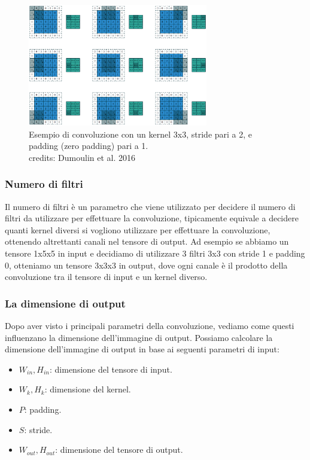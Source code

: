     \begin{figure}[H]
        \centering
        \includegraphics[width=0.7\textwidth]{imgs/kernel_convolution_padding_stride.png}
        \caption{Esempio di convoluzione con un kernel 3x3, stride pari a 2, e padding (zero padding) pari a 1.\\
        credits: Dumoulin et al. 2016 \cite{dumoulin2016guide}}
        \label{fig:kernel_convolution_padding_stride}
    \end{figure}

\subsubsection{Numero di filtri}
Il numero di filtri è un parametro che viene utilizzato per decidere il numero di filtri da utilizzare per effettuare la convoluzione,
tipicamente equivale a decidere quanti kernel diversi si vogliono utilizzare per effettuare la convoluzione, ottenendo altrettanti canali nel
tensore di output. Ad esempio se abbiamo un tensore 1x5x5 in input e decidiamo di utilizzare 3 filtri 3x3 con stride 1 e padding 0,
otteniamo un tensore 3x3x3 in output, dove ogni canale è il prodotto della convoluzione tra il tensore di input e un kernel diverso.

\subsubsection{La dimensione di output}
Dopo aver visto i principali parametri della convoluzione, vediamo come questi influenzano la dimensione dell'immagine di output.
Possiamo calcolare la dimensione dell'immagine di output in base ai seguenti parametri di input:
\begin{itemize}
    \item $W_{in}, H_{in}$: dimensione del tensore di input.
    \item $W_{k}, H_{k}$: dimensione del kernel.
    \item $P$: padding.
    \item $S$: stride.
    \item $W_{out}, H_{out}$: dimensione del tensore di output.
\end{itemize}

